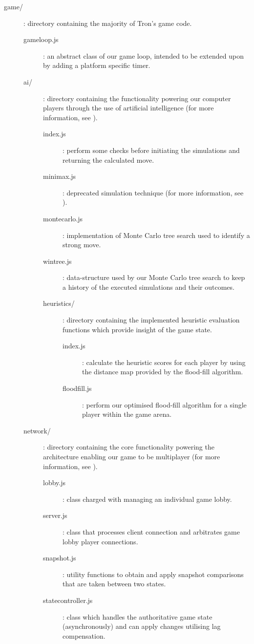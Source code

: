 \documentclass{standalone}
\begin{document}
\begin{formal}
\begin{description}
\begin{description}
					    \item[game/]: directory containing the majority of Tron's game code.
			      	\begin{description}
			      		\item[gameloop.js]: an abstract class of our game loop, intended to be extended upon by adding a platform specific timer.

			      		\item[ai/]: directory containing the functionality powering our computer players through the use of artificial intelligence (for more information, see ).
				      	\begin{description}
				      		\item[index.js]: perform some checks before initiating the simulations and returning the calculated move.
				      		\item[minimax.js]: deprecated simulation technique (for more information, see ).
				      		\item[montecarlo.js]: implementation of Monte Carlo tree search used to identify a strong move.
				      		\item[wintree.js]: data-structure used by our Monte Carlo tree search to keep a history of the executed simulations and their outcomes.

				      		\item[heuristics/]: directory containing the implemented heuristic evaluation functions which provide insight of the game state.
					      	\begin{description}
				      			\item[index.js]: calculate the heuristic scores for each player by using the distance map provided by the flood-fill algorithm.
				      			\item[floodfill.js]: perform our optimised flood-fill algorithm for a single player within the game arena.
					      	\end{description}
						    \end{description}

						    \item[network/]: directory containing the core functionality powering the architecture enabling our game to be multiplayer (for more information, see ).
				      	\begin{description}
			      			\item[lobby.js]: class charged with managing an individual game lobby.
			      			\item[server.js]: class that processes client connection and arbitrates game lobby player connections.
			      			\item[snapshot.js]: utility functions to obtain and apply snapshot comparisons that are taken between two states.
			      			\item[statecontroller.js]: class which handles the authoritative game state (asynchronously) and can apply changes utilising lag compensation.


\end{description}
\end{description}
\end{description}
\end{description}
\end{formal}
\end{document}
